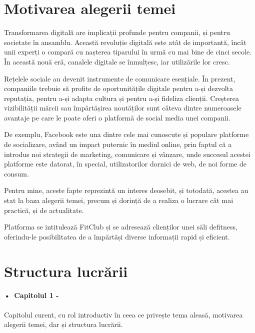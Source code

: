 \section{Motivarea alegerii temei}

Transformarea digitală are implicații profunde pentru companii, și pentru societate în ansamblu. Această revoluție digitală este atât de importantă, încât unii experți o compară cu nașterea tiparului în urmă cu mai bine de cinci secole. În această nouă eră, canalele digitale se înmulțesc, iar utilizările lor cresc.\newline
 
Rețelele sociale au devenit instrumente de comunicare esențiale. În prezent, companiile trebuie să profite de oportunitățile digitale pentru a-și dezvolta reputația, pentru a-și adapta cultura și pentru a-și fideliza clienții. Creșterea vizibilității mărcii sau împărtășirea noutăților sunt câteva dintre numeroasele avantaje pe care le poate oferi o platformă de social media unei companii.\newline
 
De exemplu, Facebook este una dintre cele mai cunoscute și populare platforme de socializare, având un impact puternic în mediul online, prin faptul că a introdus noi strategii de marketing, comunicare și vânzare, unde succesul acestei platforme este datorat, în special, utilizatorilor dornici de web, de noi forme de consum.\newline

Pentru mine, aceste fapte reprezintă un interes deosebit, și totodată, acestea au stat la baza alegerii temei, precum și dorință de a realiza o lucrare cât mai practică, și de actualitate.\newline

Platforma se intitulează FitClub și se adresează clienților unei săli de\newline fitness, oferindu-le posibilitatea de a împărtăși diverse informații rapid și eficient.\newline

\section{Structura lucrării}

\paragraph{•\, Capitolul 1 -}Capitolul curent, cu rol introductiv în ceea ce privește tema aleasă, motivarea alegerii temei, dar și structura lucrării.

